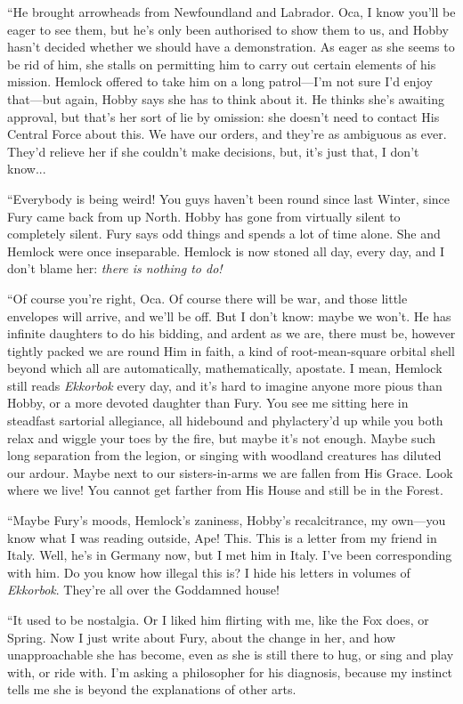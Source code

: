 \documentclass[11pt,a5paper]{article}
\begin{document}
``He brought arrowheads from Newfoundland and Labrador. Oca, I know you'll be eager to see them, but he's only been authorised to show them to us, and Hobby hasn't decided whether we should have a demonstration. As eager as she seems to be rid of him, she stalls on permitting him to carry out certain elements of his mission. Hemlock offered to take him on a long patrol---I'm not sure I'd enjoy that---but again, Hobby says she has to think about it. He thinks she's awaiting approval, but that's her sort of lie by omission: she doesn't need to contact His Central Force about this. We have our orders, and they're as ambiguous as ever. They'd relieve her if she couldn't make decisions, but, it's just that, I don't know...

``Everybody is being weird! You guys haven't been round since last Winter, since Fury came back from up North. Hobby has gone from virtually silent to completely silent. Fury says odd things and spends a lot of time alone. She and Hemlock were once inseparable. Hemlock is now stoned all day, every day, and I don't blame her: \emph{there is nothing to do!}

``Of course you're right, Oca. Of course there will be war, and those little envelopes will arrive, and we'll be off. But I don't know: maybe we won't. He has infinite daughters to do his bidding, and ardent as we are, there must be, however tightly packed we are round Him in faith, a kind of root-mean-square orbital shell beyond which all are automatically, mathematically, apostate. I mean, Hemlock still reads \emph{Ekkorbok} every day, and it's hard to imagine anyone more pious than Hobby, or a more devoted daughter than Fury. You see me sitting here in steadfast sartorial allegiance, all hidebound and phylactery'd up while you both relax and wiggle your toes by the fire, but maybe it's not enough. Maybe such long separation from the legion, or singing with woodland creatures has diluted our ardour. Maybe next to our sisters-in-arms we are fallen from His Grace. Look where we live! You cannot get farther from His House and still be in the Forest.

``Maybe Fury's moods, Hemlock's zaniness, Hobby's recalcitrance, my own---you know what I was reading outside, Ape! This. This is a letter from my friend in Italy. Well, he's in Germany now, but I met him in Italy. I've been corresponding with him. Do you know how illegal this is? I hide his letters in volumes of \emph{Ekkorbok}. They're all over the Goddamned house!

``It used to be nostalgia. Or I liked him flirting with me, like the Fox does, or Spring. Now I just write about Fury, about the change in her, and how unapproachable she has become, even as she is still there to hug, or sing and play with, or ride with. I'm asking a philosopher for his diagnosis, because my instinct tells me she is beyond the explanations of other arts.
\end{document}
